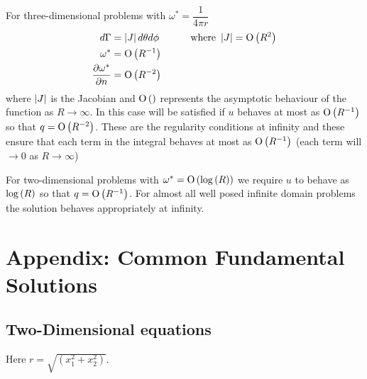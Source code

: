 For three-dimensional problems with $\omega^{*}=\dfrac{1}{4 \pi r}$
\begin{alignat*}{2}
  d\Gamma &= \left| J \right| d\theta d\phi && \qquad \text{where } 
          \left| J \right| =  \mathrm{O}\left( R^{2} \right)  \\ 
  \omega^{*} &=  \mathrm{O}\left( R^{-1} \right)  & & \\ 
   \dfrac{\partial \omega^{*}}{\partial n}  &=  \mathrm{O}\left( R^{-2} \right)  &&
  \label{eqn:3-Dprob}
\end{alignat*}
where $\left| J \right|$ is the Jacobian and $ \mathrm{O}\left(  \right) $ represents the asymptotic behaviour
of the function as $R \rightarrow\infty$. In this case 
will be satisfied if $u$ behaves at most as $ \mathrm{O}\left( R^{-1} \right) $ so that
$q= \mathrm{O}\left( R^{-2} \right) $.  These are the regularity conditions at infinity and these
ensure that each term in the integral  behaves
at most as $ \mathrm{O}\left( R^{-1} \right) $ (\ie each term will $\rightarrow 0$ as $R
\rightarrow\infty$)

For two-dimensional problems with $\omega^{*}= \mathrm{O}\left( \log \left( R \right) \right) $ we
require $u$ to behave as $\log \left( R \right)$ so that $q= \mathrm{O}\left( R^{-1} \right) $. For
almost all well posed infinite domain problems the solution behaves
appropriately at infinity.
\clearpage
\section{Appendix: Common Fundamental Solutions}
\label{app:fundamentalsolutions}
\subsection{Two-Dimensional equations}
Here $r=\sqrt{\left(x_{1}^{2} + x_{2}^{2} \right)}$.

